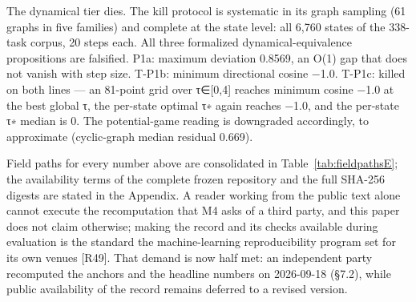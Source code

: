\documentclass[11pt,a4paper]{article}
\begin{document}
The dynamical tier dies. The kill protocol is systematic in its graph sampling (61 graphs in five families) and complete at the state level: all 6,760 states of the 338-task corpus, 20 steps each. All three formalized dynamical-equivalence propositions are falsified. P1a: maximum deviation 0.8569, an O(1) gap that does not vanish with step size. T-P1b: minimum directional cosine −1.0. T-P1c: killed on both lines — an 81-point grid over τ∈[0,4] reaches minimum cosine −1.0 at the best global τ, the per-state optimal τ∗ again reaches −1.0, and the per-state τ∗ median is 0. The potential-game reading is downgraded accordingly, to approximate (cyclic-graph median residual 0.669).

Field paths for every number above are consolidated in Table~\ref{tab:fieldpathsE}; the availability terms of the complete frozen repository and the full SHA-256 digests are stated in the Appendix. A reader working from the public text alone cannot execute the recomputation that M4 asks of a third party, and this paper does not claim otherwise; making the record and its checks available during evaluation is the standard the machine-learning reproducibility program set for its own venues [R49]. That demand is now half met: an independent party recomputed the anchors and the headline numbers on 2026-09-18 (§7.2), while public availability of the record remains deferred to a revised version.
\end{document}
